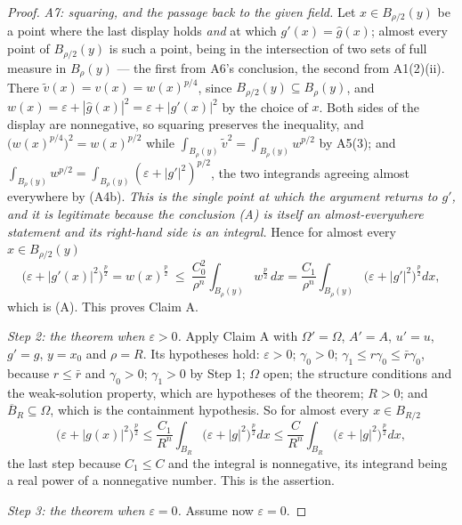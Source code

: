 \begin{proof}
\emph{A7: squaring, and the passage back to the given field.}  Let
$x\in B_{\rho/2}(y)$ be a point where the last display holds \emph{and} at which
$g'(x)=\hat g(x)$; almost every point of $B_{\rho/2}(y)$ is such a point, being
in the intersection of two sets of full measure in $B_\rho(y)$ --- the first
from A6's conclusion, the second from A1(2)(ii).  There
$\tilde v(x)=v(x)=w(x)^{p/4}$, since $B_{\rho/2}(y)\subseteq B_\rho(y)$, and
$w(x)=\varepsilon+|\hat g(x)|^2=\varepsilon+|g'(x)|^2$ by the choice of $x$.
Both sides of the display are nonnegative, so squaring preserves the inequality,
and $\bigl(w(x)^{p/4}\bigr)^2=w(x)^{p/2}$ while
$\int_{B_\rho(y)}\tilde v^2=\int_{B_\rho(y)}w^{p/2}$ by A5(3); and
$\int_{B_\rho(y)}w^{p/2}=\int_{B_\rho(y)}(\varepsilon+|g'|^2)^{p/2}$, the two
integrands agreeing almost everywhere by (A4b).  \emph{This is the single point
at which the argument returns to $g'$, and it is legitimate because the
conclusion (A) is itself an almost-everywhere statement and its right-hand side
is an integral.}  Hence for almost
every $x\in B_{\rho/2}(y)$
\[
\bigl(\varepsilon+|g'(x)|^2\bigr)^{\frac p2}=w(x)^{\frac p2}
\ \le\ \frac{C_0^2}{\rho^n}\int_{B_\rho(y)}w^{\frac p2}\,dx
=\frac{C_1}{\rho^n}\int_{B_\rho(y)}\bigl(\varepsilon+|g'|^2\bigr)^{\frac p2}dx ,
\]
which is (A).  This proves Claim A.

\emph{Step 2: the theorem when $\varepsilon>0$.}  Apply Claim A with
$\Omega'=\Omega$, $A'=A$, $u'=u$, $g'=g$, $y=x_0$ and $\rho=R$.  Its hypotheses
hold: $\varepsilon>0$; $\gamma_0>0$; $\gamma_1\le r\gamma_0\le\bar r\gamma_0$,
because $r\le\bar r$ and $\gamma_0>0$; $\gamma_1>0$ by Step 1; $\Omega$ open;
the structure conditions and the weak-solution property, which are hypotheses of
the theorem; $R>0$; and $\overline B_R\subseteq\Omega$, which is the containment
hypothesis.  So for almost every $x\in B_{R/2}$
\[
\bigl(\varepsilon+|g(x)|^2\bigr)^{\frac p2}
\le\frac{C_1}{R^n}\int_{B_R}\bigl(\varepsilon+|g|^2\bigr)^{\frac p2}dx
\le\frac{C}{R^n}\int_{B_R}\bigl(\varepsilon+|g|^2\bigr)^{\frac p2}dx ,
\]
the last step because $C_1\le C$ and the integral is nonnegative, its integrand
being a real power of a nonnegative number.  This is the assertion.

\emph{Step 3: the theorem when $\varepsilon=0$.}  Assume now $\varepsilon=0$.


\end{proof}
